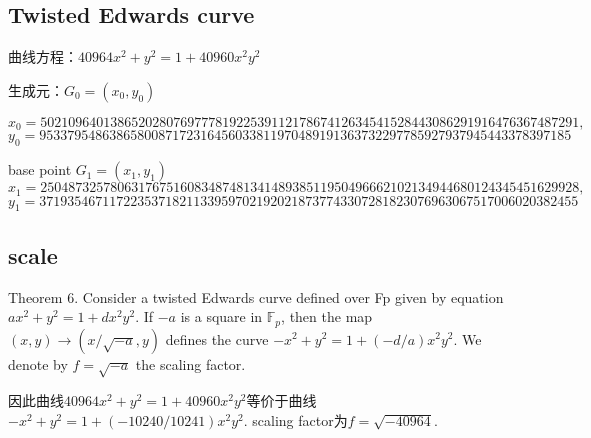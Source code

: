 \documentclass[10pt]{ctexart}
\begin{document}




\subsection{Twisted Edwards curve}
曲线方程：$40964x^2 + y^2 = 1 + 40960x^2y^2$

生成元：$G_0=(x_0,y_0)$

$$
x_0 = 50210964013865202807697778192253911217867412634541528443086291916476367487291 ,
$$
$$
y_0=9533795486386580087172316456033811970489191363732297785927937945443378397185
$$

base point $G_1 = (x_1,y_1)$
$$
x_1 = 25048732578063176751608348748134148938511950496662102134944680124345451629928 ,
$$
$$
y_1=37193546711722353718211339597021920218737743307281823076963067517006020382455
$$
\subsection{scale}
Theorem 6. Consider a twisted Edwards curve defined over Fp given by equation $ax^2 + y^2 = 1 + dx^2y^2$. If $−a$ is a square in $\mathbb{F}_p$, then the map $(x, y) \rightarrow (x/\sqrt{-a}, y)$ defines the curve $−x^2 + y^2 = 1 + (−d/a)x^2y^2$. We denote by $f = \sqrt{-a}$ the scaling factor.

因此曲线$40964x^2 + y^2 = 1 + 40960x^2y^2$等价于曲线$-x^2+y^2 = 1 + (-10240/10241)x^2y^2$. scaling factor为$f = \sqrt{-40964}$.
\end{document}
